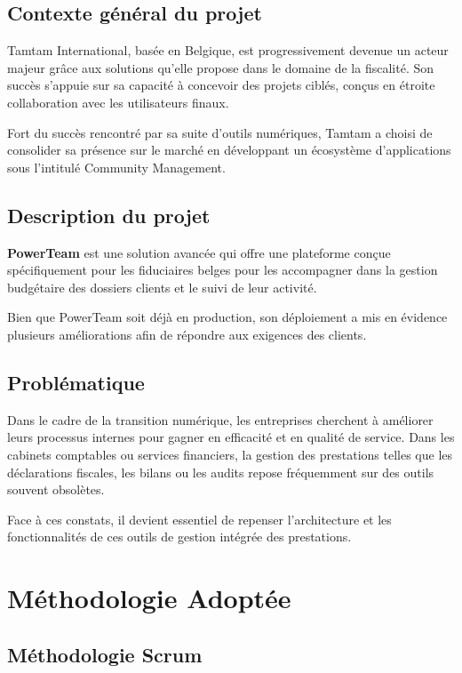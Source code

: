 \begin{itemize}
\begin{itemize}
\begin{itemize}
\begin{itemize}
\begin{itemize}
\subsection{Contexte général du projet}

Tamtam International, basée en Belgique, est progressivement devenue un acteur majeur grâce aux solutions qu'elle propose dans le domaine de la fiscalité. Son succès s'appuie sur sa capacité à concevoir des projets ciblés, conçus en étroite collaboration avec les utilisateurs finaux.

Fort du succès rencontré par sa suite d'outils numériques, Tamtam a choisi de consolider sa présence sur le marché en développant un écosystème d'applications sous l'intitulé Community Management.

\subsection{Description du projet}

\textbf{PowerTeam} est une solution avancée qui offre une plateforme conçue spécifiquement pour les fiduciaires belges pour les accompagner dans la gestion budgétaire des dossiers clients et le suivi de leur activité.

Bien que PowerTeam soit déjà en production, son déploiement a mis en évidence plusieurs améliorations afin de répondre aux exigences des clients.

\subsection{Problématique}

Dans le cadre de la transition numérique, les entreprises cherchent à améliorer leurs processus internes pour gagner en efficacité et en qualité de service. Dans les cabinets comptables ou services financiers, la gestion des prestations telles que les déclarations fiscales, les bilans ou les audits repose fréquemment sur des outils souvent obsolètes.

Face à ces constats, il devient essentiel de repenser l'architecture et les fonctionnalités de ces outils de gestion intégrée des prestations.

\section{Méthodologie Adoptée}

\subsection{Méthodologie Scrum}


\end{itemize}
\end{itemize}
\end{itemize}
\end{itemize}
\end{itemize}
